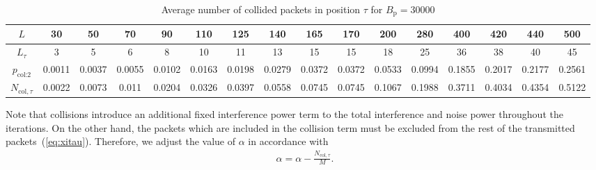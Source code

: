\documentclass[journal,onecolumn,12pt]{IEEEtran}
\begin{document}
\begin{table}[!h]
\tiny
\centering
\caption{Average number of collided packets in  position $\tau$ for $B_{\text{p}}=30000$}
\begin{tabular}{| c | c c c c c c c c c c c c c c c |}
 \hline
 $L$ & 30 & 50 & 70 & 90 & 110 & 125 & 140  & 165 & 170  & 200 & 280 & 400 & 420 & 440 & 500\\
 \hline
 $L_{\tau}$ & 3 & 5 & 6  & 8  & 10 & 11 & 13 & 15 & 15 & 18 & 25 & 36 & 38 & 40 & 45\\
 \hline
  $p_{\textrm{col:2}}$ & 0.0011 & 0.0037 & 0.0055  & 0.0102  & 0.0163 & 0.0198 & 0.0279 & 0.0372 & 0.0372 & 0.0533 & 0.0994 & 0.1855 & 0.2017 & 0.2177 & 0.2561 \\
 \hline
 $N_{\textrm{col},\tau}$ & 0.0022 & 0.0073 & 0.011  & 0.0204  & 0.0326 & 0.0397 & 0.0558  & 0.0745 & 0.0745 & 0.1067 & 0.1988 & 0.3711 & 0.4034 & 0.4354 & 0.5122 \\
 \hline
\end{tabular} \label{tab:Ncol_30k}
\end{table} 

Note that collisions introduce an additional fixed interference power term to the total interference and noise power throughout the iterations. On the other hand, the packets which are included in the collision term must be excluded from the rest of the transmitted packets~(\ref{eq:xitau}). Therefore, we adjust the value of $\alpha$ in accordance with
\begin{align}
\alpha = \alpha -\frac{N_{\textrm{col},\tau}}{M}.
\label{eq:alpha_mod}
\end{align}


\end{document}
